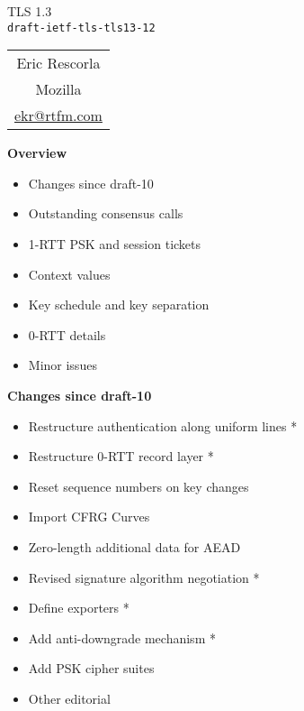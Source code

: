 \documentclass[helvetica]{seminar}
\newcommand{\heading}[1]{%
  \begin{center} 
    \large\bf 
    #1 
  \end{center} 
  \vspace{.4 in}}
\begin{document}
\begin{slide}
\begin{center}
\vspace{.5 in}
\LARGE{{\bf}TLS 1.3\\{\small \verb^draft-ietf-tls-tls13-12^}}\\
\vspace{.2in}
\large{
\begin{tabular}{c}
Eric Rescorla\\
Mozilla\\
\url{ekr@rtfm.com}
\end{tabular}
}
\end{center}

\end{slide}

\centerslidesfalse 


\begin{slide}
\heading{Overview}

\begin{itemize}
\item Changes since draft-10
\item Outstanding consensus calls
\item 1-RTT PSK and session tickets
\item Context values
\item Key schedule and key separation
\item 0-RTT details
\item Minor issues
\end{itemize}
\end{slide}

\begin{slide}
\heading{Changes since draft-10}

\begin{itemize}
\item Restructure authentication along uniform lines *
\item Restructure 0-RTT record layer *
\item Reset sequence numbers on key changes 
\item Import CFRG Curves
\item Zero-length additional data for AEAD
\item Revised signature algorithm negotiation *
\item Define exporters *
\item Add anti-downgrade mechanism *
\item Add PSK cipher suites
\item Other editorial
\end{itemize}
\end{slide}
\end{document}

